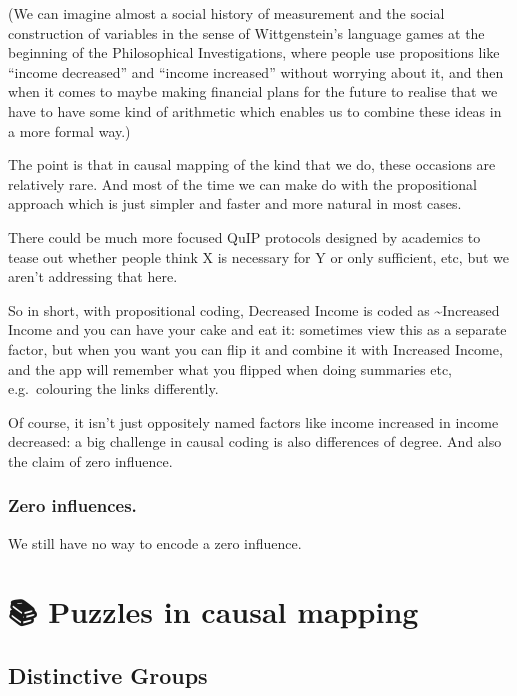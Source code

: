 \documentclass[
]{book}
\begin{document}
(We can imagine almost a social history of measurement and the social construction of variables in the sense of Wittgenstein's
language games at the beginning of the Philosophical Investigations, where people use propositions like ``income decreased'' and ``income increased'' without worrying about it, and then when it comes to maybe making financial plans for the future to realise that we have to have some kind of arithmetic which enables us to combine these ideas in a more formal way.)

The point is that in causal mapping of the kind that we do, these occasions are relatively rare. And most of the time we can make do with the propositional approach which is just simpler and faster and more natural in most cases.

There could be much more focused QuIP protocols designed by academics to tease out whether people think X is necessary for Y or only sufficient, etc, but we aren't addressing that here.

So in short, with propositional coding, Decreased Income is coded as \textasciitilde Increased Income and you can have your cake and eat it: sometimes view this as a separate factor, but when you want you can flip it and combine it with Increased Income, and the app will remember what you flipped when doing summaries etc, e.g.~colouring the links differently.

Of course, it isn't just oppositely named factors like income increased in income decreased: a big challenge in causal coding is also differences of degree. And also the claim of zero influence.

\hypertarget{zero-influences.}{%
\subsection{Zero influences.}\label{zero-influences.}}

We still have no way to encode a zero influence.

\hypertarget{puzzles-in-causal-mapping}{%
\chapter{📚 Puzzles in causal mapping}\label{puzzles-in-causal-mapping}}

\hypertarget{distinctive-groups}{%
\section{Distinctive Groups}\label{distinctive-groups}}
\end{document}
